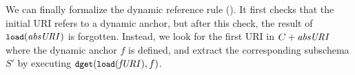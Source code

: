 We can finally formalize the dynamic reference rule (\rddref). 
It first checks that the initial URI refers to a dynamic anchor, but after this check, the result of
$\mbox{\tt{\small load}}(\mathit{absURI})$ is forgotten. Instead, we look for the first URI  in $C+\mathit{absURI}$ where the dynamic anchor $f$
is defined, and extract the corresponding subschema $S'$ by executing $\mbox{\tt{\small dget}}(\mbox{\tt{\small load}}(\mathit{fURI}),f)$.



